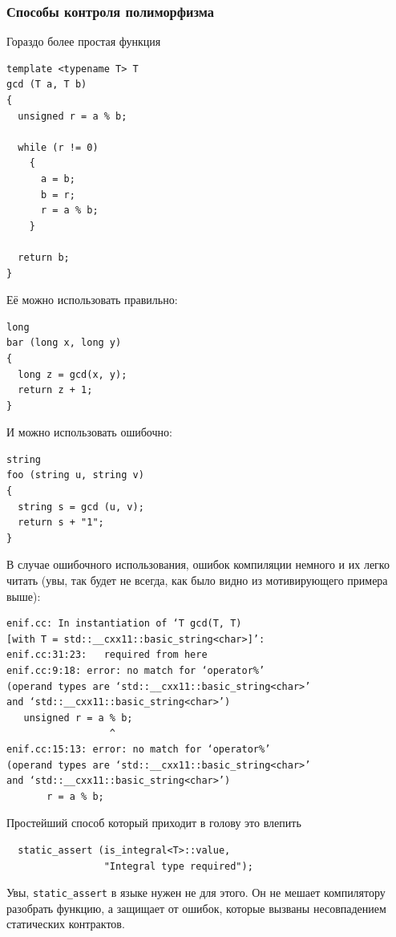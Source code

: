 \documentclass[a4paper,12pt,oneside]{article}
\begin{document}
\subsubsection{Способы контроля полиморфизма}

Гораздо более простая функция

\begin{lstlisting}
template <typename T> T
gcd (T a, T b)
{
  unsigned r = a % b;

  while (r != 0)
    {
      a = b;
      b = r;
      r = a % b;
    }

  return b;
}
\end{lstlisting}

Её можно использовать правильно:

\begin{lstlisting}
long
bar (long x, long y)
{
  long z = gcd(x, y);
  return z + 1;
}
\end{lstlisting}

И можно использовать ошибочно:

\begin{lstlisting}
string
foo (string u, string v)
{
  string s = gcd (u, v);
  return s + "1";  
}
\end{lstlisting}

В случае ошибочного использования, ошибок компиляции немного и их легко читать (увы, так будет не всегда, как было видно из мотивирующего примера выше):

\begin{verbatim}
enif.cc: In instantiation of ‘T gcd(T, T) 
[with T = std::__cxx11::basic_string<char>]’:
enif.cc:31:23:   required from here
enif.cc:9:18: error: no match for ‘operator%’ 
(operand types are ‘std::__cxx11::basic_string<char>’ 
and ‘std::__cxx11::basic_string<char>’)
   unsigned r = a % b;
                  ^
enif.cc:15:13: error: no match for ‘operator%’ 
(operand types are ‘std::__cxx11::basic_string<char>’ 
and ‘std::__cxx11::basic_string<char>’)
       r = a % b;
\end{verbatim}

Простейший способ который приходит в голову это влепить 

\begin{lstlisting}
  static_assert (is_integral<T>::value,
                 "Integral type required");
\end{lstlisting}

Увы, \lstinline!static_assert! в языке нужен не для этого. Он не мешает компилятору разобрать функцию, а защищает от ошибок, которые вызваны несовпадением статических контрактов.
\end{document}
